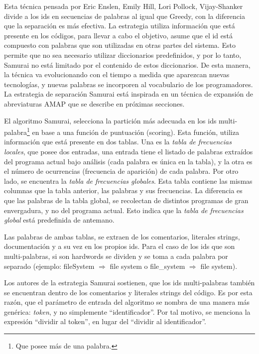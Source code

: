 Esta técnica pensada por Eric Enslen, Emily Hill, Lori Pollock, Vijay-Shanker \cite{EHPV09} divide a los ids en secuencias de palabras al igual que Greedy, con la diferencia que la separación es más efectiva. La estrategia utiliza información que está presente en los códigos, para llevar a cabo el objetivo, asume que el id está compuesto con palabras que son utilizadas en otras partes del sistema. Esto permite que no sea necesario utilizar diccionarios predefinidos, y por lo tanto, Samurai no está limitado por el contenido de estos diccionarios. De esta manera, la técnica va evolucionando con el tiempo a medida que aparezcan nuevas tecnologías, y nuevas palabras se incorporen al vocabulario de los programadores.
La estrategia de separación Samurai está inspirada en un técnica de expansión de abreviaturas AMAP \cite{EZH08} que se describe en próximas secciones.

El algoritmo Samurai, selecciona la partición más adecuada en los ids multi-palabra\footnote[1]{Que posee más de una palabra.} en base a una función de puntuación (scoring). Esta función, utiliza información que está presente en dos tablas.
Una es la \textit{tabla de frecuencias locales}, que posee dos entradas, una entrada tiene el listado de palabras extraídos del programa actual bajo análisis (cada palabra es única en la tabla), y la otra es el número de ocurrencias (frecuencia de aparición) de cada palabra.
Por otro lado, se encuentra la \textit{tabla de frecuencias globales}. Esta tabla contiene las mismas columnas que la tabla anterior, las palabras y sus frecuencias. La diferencia es que las palabras de la tabla global, se recolectan de distintos programas de gran envergadura, y no del programa actual. Esto indica que la \textit{tabla de frecuencias global} está predefinida de antemano.

Las palabras de ambas tablas, se extraen de los comentarios, literales strings, documentación y a su vez en los propios ids. Para el caso de los ids que son multi-palabras, si son hardwords se dividen y se toma a cada palabra por separado (ejemplo: \textsf{fileSystem} $\Rightarrow$ \textsf{file system} o \textsf{file\_system} $\Rightarrow$ \textsf{file system}).

Los autores de la estrategia Samurai sostienen, que los ids multi-palabras también se encuentran dentro de los comentarios y literales strings del código. Es por esta razón, que el parámetro de entrada del algoritmo se nombra de una manera más genérica: \textit{token}, y no simplemente “identificador”. Por tal motivo, se menciona la expresión “dividir al token”, en lugar del “dividir al identificador”.


